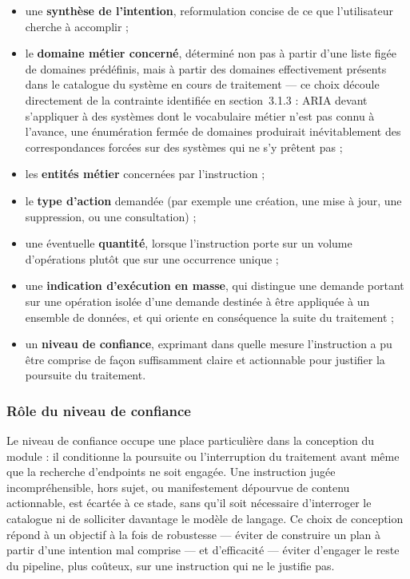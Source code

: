 \begin{itemize}
    \item une \textbf{synthèse de l'intention}, reformulation concise de ce que l'utilisateur cherche à accomplir ;
    \item le \textbf{domaine métier concerné}, déterminé non pas à partir d'une liste figée de domaines prédéfinis, mais à partir des domaines effectivement présents dans le catalogue du système en cours de traitement — ce choix découle directement de la contrainte identifiée en section~3.1.3 : ARIA devant s'appliquer à des systèmes dont le vocabulaire métier n'est pas connu à l'avance, une énumération fermée de domaines produirait inévitablement des correspondances forcées sur des systèmes qui ne s'y prêtent pas ;
    \item les \textbf{entités métier} concernées par l'instruction ;
    \item le \textbf{type d'action} demandée (par exemple une création, une mise à jour, une suppression, ou une consultation) ;
    \item une éventuelle \textbf{quantité}, lorsque l'instruction porte sur un volume d'opérations plutôt que sur une occurrence unique ;
    \item une \textbf{indication d'exécution en masse}, qui distingue une demande portant sur une opération isolée d'une demande destinée à être appliquée à un ensemble de données, et qui oriente en conséquence la suite du traitement ;
    \item un \textbf{niveau de confiance}, exprimant dans quelle mesure l'instruction a pu être comprise de façon suffisamment claire et actionnable pour justifier la poursuite du traitement.
\end{itemize}

\subsubsection{Rôle du niveau de confiance}

Le niveau de confiance occupe une place particulière dans la conception du module : il conditionne la poursuite ou l'interruption du traitement avant même que la recherche d'endpoints ne soit engagée. Une instruction jugée incompréhensible, hors sujet, ou manifestement dépourvue de contenu actionnable, est écartée à ce stade, sans qu'il soit nécessaire d'interroger le catalogue ni de solliciter davantage le modèle de langage. Ce choix de conception répond à un objectif à la fois de robustesse — éviter de construire un plan à partir d'une intention mal comprise — et d'efficacité — éviter d'engager le reste du pipeline, plus coûteux, sur une instruction qui ne le justifie pas.

